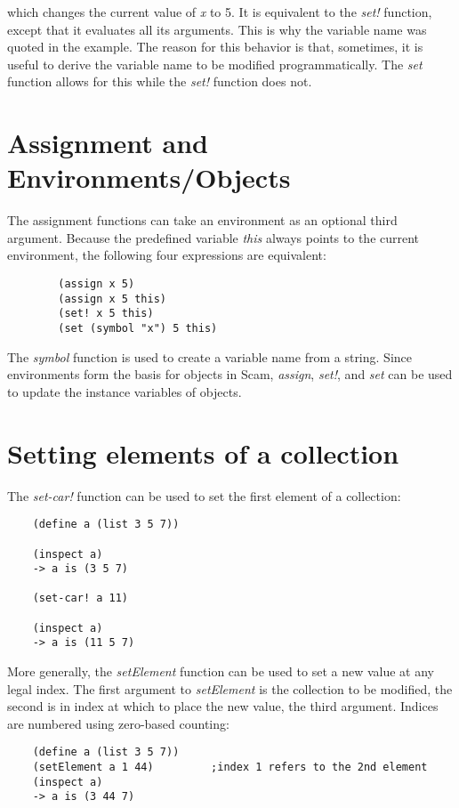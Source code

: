 which changes the current value of {\it x} to 5.
It is equivalent to the {\it set!} function,
except that it evaluates all its arguments. This
is why the variable name was quoted in the example.
The reason for this behavior is that, sometimes,
it is useful to derive the variable name
to be modified programmatically. The {\it set} function
allows for this while the {\it set!} function does not.

\section{Assignment and Environments/Objects}

The assignment functions can take an environment as an
optional third argument.
Because the predefined variable
{\it this} always points to the current environment,
the following
four expressions are equivalent:

\begin{verbatim}
        (assign x 5)
        (assign x 5 this)
        (set! x 5 this)
        (set (symbol "x") 5 this)
\end{verbatim}

The {\it symbol} function is used to create a variable name from
a string.
Since environments form the basis for objects in Scam,
{\it assign}, {\it set!}, and {\it set} 
can be used to update the instance variables
of objects.

\section{Setting elements of a collection}
\label{ListsStringsArraysSetting}

The {\it set-car!} function can be used to set the first element of
a collection:

\begin{verbatim}
    (define a (list 3 5 7))

    (inspect a)
    -> a is (3 5 7)

    (set-car! a 11)

    (inspect a)
    -> a is (11 5 7)
\end{verbatim}

More generally, the {\it setElement} function can be used to set a new value
at any legal index. The first argument to {\it setElement} is the collection
to be modified, the second is in index at which to place the new value,
the third argument.
Indices are numbered using zero-based counting:

\begin{verbatim}
    (define a (list 3 5 7))
    (setElement a 1 44)         ;index 1 refers to the 2nd element
    (inspect a)
    -> a is (3 44 7)
\end{verbatim}

